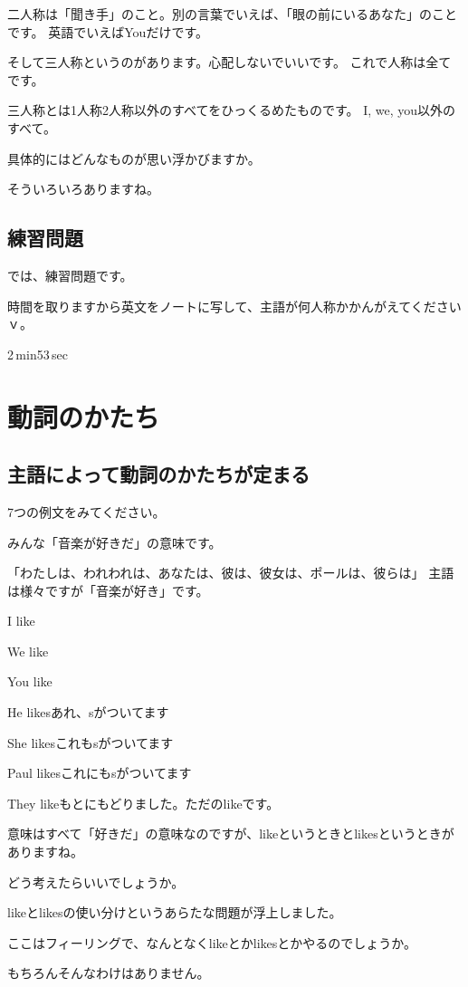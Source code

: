 \documentclass[book,jafontscale=0.9247]{jlreq}
\newcommand{\myMouse}{%
  {\large \ComputerMouse}
}
\begin{document}
二人称は「聞き手」のこと。別の言葉でいえば、「眼の前にいるあなた」のことです。
英語でいえばYouだけです。

そして三人称というのがあります。心配しないでいいです。
これで人称は全てです。

三人称とは1人称2人称以外のすべてをひっくるめたものです。
I, we, you以外のすべて。
\myMouse
具体的にはどんなものが思い浮かびますか。

そういろいろありますね。

\subsection{練習問題}

では、練習問題です。

時間を取りますから英文をノートに写して、主語が何人称かかんがえてくださいｖ。

2\,min53\,sec

\section{動詞のかたち}
\subsection{主語によって動詞のかたちが定まる}

7つの例文をみてください。

みんな「音楽が好きだ」の意味です。

「わたしは、われわれは、あなたは、彼は、彼女は、ポールは、彼らは」
主語は様々ですが「音楽が好き」です。

I like

We like

You like

He likesあれ、sがついてます

She likesこれもsがついてます

Paul likesこれにもsがついてます

They likeもとにもどりました。ただのlikeです。

意味はすべて「好きだ」の意味なのですが、likeというときとlikesというときがありますね。

どう考えたらいいでしょうか。

likeとlikesの使い分けというあらたな問題が浮上しました。

ここはフィーリングで、なんとなくlikeとかlikesとかやるのでしょうか。

もちろんそんなわけはありません。
\end{document}
